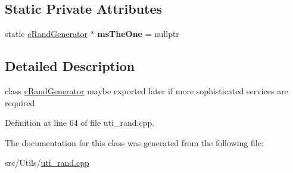 \subsection*{Static Private Attributes}
\begin{DoxyCompactItemize}
\item 
static \hyperlink{classMMVII_1_1cRandGenerator}{c\+Rand\+Generator} $\ast$ {\bfseries ms\+The\+One} = nullptr\hypertarget{classMMVII_1_1cRandGenerator_a18c5fa81cecd642886356c785fc25ae1}{}\label{classMMVII_1_1cRandGenerator_a18c5fa81cecd642886356c785fc25ae1}

\end{DoxyCompactItemize}


\subsection{Detailed Description}
class \hyperlink{classMMVII_1_1cRandGenerator}{c\+Rand\+Generator} maybe exported later if more sophisticated services are required 

Definition at line 64 of file uti\+\_\+rand.\+cpp.



The documentation for this class was generated from the following file\+:\begin{DoxyCompactItemize}
\item 
src/\+Utils/\hyperlink{uti__rand_8cpp}{uti\+\_\+rand.\+cpp}\end{DoxyCompactItemize}
